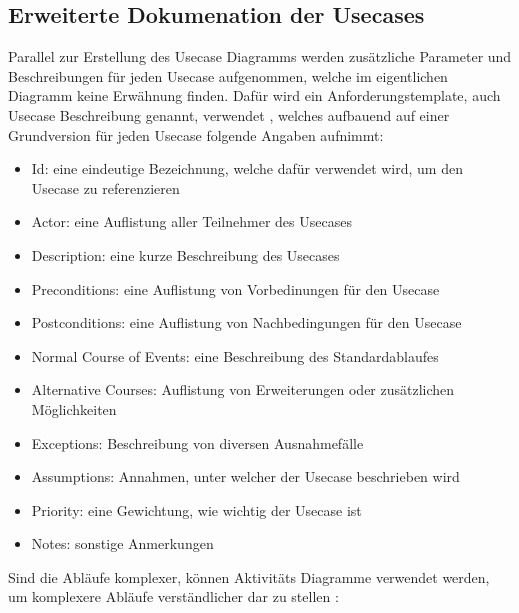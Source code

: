 \subsection{Erweiterte Dokumenation der Usecases}
Parallel zur Erstellung des Usecase Diagramms werden zusätzliche Parameter und Beschreibungen für jeden Usecase aufgenommen, welche im eigentlichen Diagramm keine Erwähnung finden.
Dafür wird ein Anforderungstemplate, auch Usecase Beschreibung genannt, verwendet \cite[S. 214]{reqman}, welches aufbauend auf einer Grundversion \cite[Abbildung 8.14, S. 215]{reqman} für jeden Usecase folgende Angaben aufnimmt:

\begin{itemize}
  \item Id: eine eindeutige Bezeichnung, welche dafür verwendet wird, um den Usecase zu referenzieren
  \item Actor: eine Auflistung aller Teilnehmer des Usecases
  \item Description: eine kurze Beschreibung des Usecases
  \item Preconditions: eine Auflistung von Vorbedinungen für den Usecase
  \item Postconditions: eine Auflistung von Nachbedingungen für den Usecase
  \item Normal Course of Events: eine Beschreibung des Standardablaufes
  \item Alternative Courses: Auflistung von Erweiterungen oder zusätzlichen Möglichkeiten
  \item Exceptions: Beschreibung von diversen Ausnahmefälle
  \item Assumptions: Annahmen, unter welcher der Usecase beschrieben wird
  \item Priority: eine Gewichtung, wie wichtig der Usecase ist
  \item Notes: sonstige Anmerkungen
\end{itemize}

Sind die Abläufe komplexer, können Aktivitäts Diagramme verwendet werden, um komplexere Abläufe verständlicher dar zu stellen \cite[S. 215]{reqman}:

